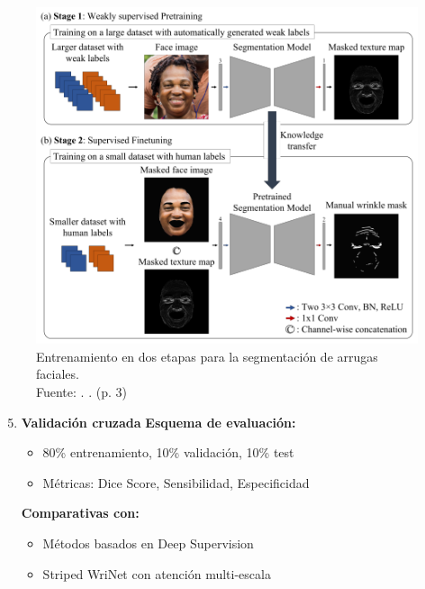 \begin{figure}[H]
    \begin{center}
        \includegraphics[width=1\textwidth]{2/figures/metoart9.png}
        \caption[Entrenamiento en dos etapas para la segmentación de arrugas faciales]{Entrenamiento en dos etapas para la segmentación de arrugas faciales.\\
            Fuente: \cite{moon2024dermatology}. . (p. 3)}
        \label{2:fig11}
    \end{center}
\end{figure}

\begin{enumerate}
    \setcounter{enumi}{4} %
    \item \textbf{Validación cruzada}
    \textbf{Esquema de evaluación:}
    \begin{itemize}[label=$\bullet$, leftmargin=1em]
        \item 80\% entrenamiento, 10\% validación, 10\% test
        \item Métricas: Dice Score, Sensibilidad, Especificidad
    \end{itemize}
    \textbf{Comparativas con:}
    \begin{itemize}[label=$\bullet$, leftmargin=1em]
        \item Métodos basados en Deep Supervision
        \item Striped WriNet con atención multi-escala
    \end{itemize}

\end{enumerate}

